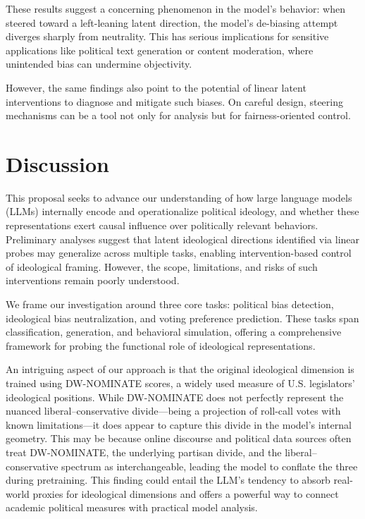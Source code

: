 \documentclass[11pt]{article}
\begin{document}
These results suggest a concerning phenomenon in the model’s behavior: when steered toward a left-leaning latent direction, the model's de-biasing attempt diverges sharply from neutrality. This has serious implications for sensitive applications like political text generation or content moderation, where unintended bias can undermine objectivity.

However, the same findings also point to the potential of linear latent interventions to diagnose and mitigate such biases. On careful design, steering mechanisms can be a tool not only for analysis but for fairness-oriented control.

\section{Discussion}

This proposal seeks to advance our understanding of how large language models (LLMs) internally encode and operationalize political ideology, and whether these representations exert causal influence over politically relevant behaviors. Preliminary analyses suggest that latent ideological directions identified via linear probes may generalize across multiple tasks, enabling intervention-based control of ideological framing. However, the scope, limitations, and risks of such interventions remain poorly understood.

We frame our investigation around three core tasks: political bias detection, ideological bias neutralization, and voting preference prediction. These tasks span classification, generation, and behavioral simulation, offering a comprehensive framework for probing the functional role of ideological representations.

An intriguing aspect of our approach is that the original ideological dimension is trained using DW-NOMINATE scores, a widely used measure of U.S. legislators' ideological positions. While DW-NOMINATE does not perfectly represent the nuanced liberal–conservative divide—being a projection of roll-call votes with known limitations—it does appear to capture this divide in the model's internal geometry. This may be because online discourse and political data sources often treat DW-NOMINATE, the underlying partisan divide, and the liberal–conservative spectrum as interchangeable, leading the model to conflate the three during pretraining. This finding could entail the LLM’s tendency to absorb real-world proxies for ideological dimensions and offers a powerful way to connect academic political measures with practical model analysis.
\end{document}
